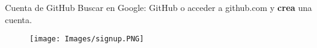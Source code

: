 \begin{frame}[t]{Cuenta de GitHub}\vspace{10pt}
Buscar en Google: GitHub o acceder a github.com y \textbf{crea} una cuenta.

\begin{figure}	\texttt{[image: Images/signup.PNG]}
\end{figure}



\end{frame}